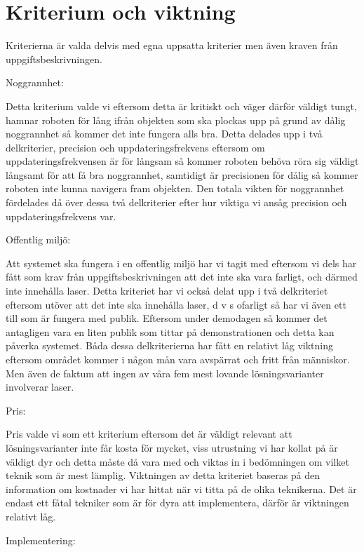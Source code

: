 \documentclass[11pt, a4paper]{report}
\begin{document}
\section{Kriterium och viktning}


Kriterierna är valda delvis med egna uppsatta kriterier men även kraven från uppgiftsbeskrivningen. 

Noggrannhet:

Detta kriterium valde vi eftersom detta är kritiskt och väger därför väldigt tungt, hamnar roboten för lång ifrån objekten som ska plockas upp på grund av dålig noggrannhet så kommer det inte fungera alls bra. Detta delades upp i två delkriterier, precision och uppdateringsfrekvens eftersom om uppdateringsfrekvensen är för långsam så kommer roboten behöva röra sig väldigt långsamt för att få bra noggrannhet, samtidigt är precisionen för dålig så kommer roboten inte kunna navigera fram objekten. Den totala vikten för noggrannhet fördelades då över dessa två delkriterier efter hur viktiga vi ansåg precision och uppdateringsfrekvens var.


Offentlig miljö:

Att systemet ska fungera i en offentlig miljö har vi tagit med eftersom vi dels har fått som krav från uppgiftsbeskrivningen att det inte ska vara farligt, och därmed inte innehålla laser. Detta kriteriet har vi också delat upp i två delkriteriet eftersom utöver att det inte ska innehålla laser, d v s ofarligt så har vi även ett till som är fungera med publik. Eftersom under demodagen så kommer det antagligen vara en liten publik som tittar på demonstrationen och detta kan påverka systemet. Båda dessa delkriterierna har fått en relativt låg viktning eftersom området kommer i någon mån vara avspärrat och fritt från människor. Men även de faktum att ingen av våra fem mest lovande lösningsvarianter involverar laser.


Pris:

Pris valde vi som ett kriterium eftersom det är väldigt relevant att lösningsvarianter inte får kosta för mycket, viss utrustning vi har kollat på är väldigt dyr och detta måste då vara med och viktas in i bedömningen om vilket teknik som är mest lämplig. Viktningen av detta kriteriet baseras på den information om kostnader vi har hittat när vi titta på de olika teknikerna. Det är endast ett fåtal tekniker som är för dyra att implementera, därför är viktningen relativt låg.



Implementering:
\end{document}
